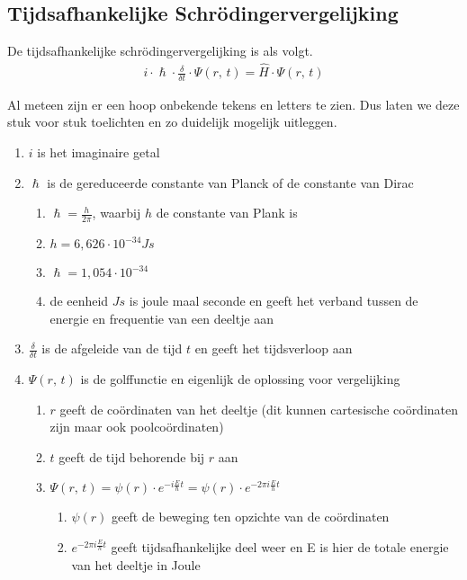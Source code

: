 \documentclass[11pt,fleqn]{book} %
\begin{document}
\subsection{Tijdsafhankelijke Schrödingervergelijking}
\begin{definition}\label{eq:tsv}
De tijdsafhankelijke schrödingervergelijking is als volgt.
\begin{align}
i \cdot \hslash \cdot \frac{\delta}{\delta t} \cdot \Psi(r,\,t) = \hat{H} \cdot \Psi(r,\,t)
\end{align}
\end{definition}

Al meteen zijn er een hoop onbekende tekens en letters te zien. Dus laten we deze stuk voor stuk toelichten en zo duidelijk mogelijk uitleggen.
\begin{enumerate}
\item $i$ is het imaginaire getal
\item $\hslash$ is de gereduceerde constante van Planck of de constante van Dirac
\begin{enumerate}
\item $\hslash = \frac{h}{2\pi}$, waarbij $h$ de constante van Plank is
\item $h = 6,626 \cdot 10^{-34} Js$
\item $\hslash = 1,054 \cdot 10^{-34}$
\item de eenheid $Js$ is joule maal seconde en geeft het verband tussen de energie en frequentie van een deeltje aan
\end{enumerate}
\item $\frac{\delta}{\delta t}$ is de afgeleide van de tijd $t$ en geeft het tijdsverloop aan
\item $\Psi(r,\,t)$ is de golffunctie en eigenlijk de oplossing voor vergelijking
\begin{enumerate}
\item $r$ geeft de coördinaten van het deeltje (dit kunnen cartesische coördinaten zijn maar ook poolcoördinaten)
\item $t$ geeft de tijd behorende bij $r$ aan
\item $\Psi(r,\,t)=\psi(r)\cdot e^{-i\frac{E}{\hslash}t}=\psi(r)\cdot e^{-2\pi i\frac{E}{h}t}$
\begin{enumerate}
\item $\psi(r)$ geeft de beweging ten opzichte van de coördinaten
\item $e^{-2\pi i\frac{E}{h}t}$ geeft tijdsafhankelijke deel weer en E is hier de totale energie van het deeltje in Joule

\end{enumerate}
\end{enumerate}
\end{enumerate}
\end{document}

